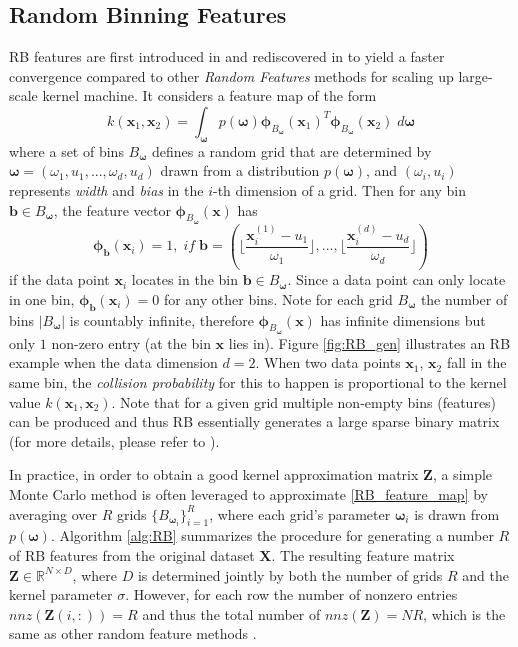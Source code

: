 \documentclass[sigconf]{acmart}
\newcommand{\R}{\mathbb{R}}
\newcommand{\1}{\boldsymbol{1}}
\newcommand{\bb}{\boldsymbol{b}}
\newcommand{\bx}{\boldsymbol{x}}
\newcommand{\omegab}{\boldsymbol{\omega}}
\newcommand{\phib}{\boldsymbol{\phi}}
\newcommand{\bX}{\mathbf{X}}
\newcommand{\bZ}{\mathbf{Z}}
\newcommand{\bphi}{\boldsymbol{\phi}}
\newcommand{\0}{\boldsymbol{0}}
\begin{document}
\subsection{Random Binning Features}
RB features are first introduced in \cite{rahimi2008random} and rediscovered in \cite{wu2016revisiting} to yield a faster convergence compared to other \emph{Random Features} methods for scaling up large-scale kernel machine. It considers a feature map of the form
\begin{equation}\label{RB_feature_map}
k(\bx_1,\bx_2)=\int_{\omegab} p(\omegab) \phib_{B_{\omegab}}(\bx_1)^T\phib_{B_{\omegab}}(\bx_2) \;d\omegab
\end{equation}
where a set of bins $B_{\omegab}$ defines a random grid that are determined by $\omegab=(\omega_1,u_1,...,\omega_d,u_d)$ drawn from a distribution $p(\omegab)$, and $(\omega_i,u_i)$ represents \emph{width} and \emph{bias} in the $i$-th dimension of a grid. Then for any bin $\bb \in B_{\omegab}$, the feature vector $\phib_{B_{\omegab}}(\bx)$ has
$$
\phib_{\bb}(\bx_i)=1, \;\textit{if}\; \bb = (\lfloor \frac{\bx_{i}^{(1)}-u_1}{\omega_1}\rfloor, ..., \lfloor \frac{\bx_{i}^{(d)}-u_d}{\omega_d}\rfloor)
$$ 
if the data point $\bx_i$ locates in the bin $\bb \in B_{\omegab}$. Since a data point can only locate in one bin, $\phib_{\bb}(\bx_i)=0$ for any other bins. 
Note for each grid $B_{\omegab}$ the number of bins $|B_{\omegab}|$ is countably infinite, therefore $\bphi_{B_{\omegab}}(\bx)$ has infinite dimensions but only $1$ non-zero entry (at the bin $\bx$ lies in). 
Figure \ref{fig:RB_gen} illustrates an RB example when the data dimension $d=2$.
When two data points $\bx_1$, $\bx_2$ fall in the same bin, the \emph{collision probability} for this to happen is proportional to the kernel value $k(\bx_1,\bx_2)$. Note that for a given grid multiple non-empty bins (features) can be produced and thus RB essentially generates a large sparse binary matrix (for more details, please refer to \cite{wu2016revisiting}). 


In practice, in order to obtain a good kernel approximation matrix $\bZ$, a simple Monte Carlo method is often leveraged to approximate \eqref{RB_feature_map} by averaging over $R$ grids $\{B_{\omegab_i}\}_{i=1}^R$, where each grid's parameter $\omegab_i$ is drawn from $p(\omegab)$. Algorithm \ref{alg:RB} summarizes the procedure for generating a number $R$ of RB features from the original dataset $\bX$. The resulting feature matrix $\bZ \in \R^{N \times D}$, where $D$ is determined jointly by both the number of grids $R$ and the kernel parameter $\sigma$. However, for each row the number of nonzero entries $nnz(\bZ(i,:)) = R$ and thus the total number of $nnz(\bZ) = NR$, which is the same as other random feature methods \cite{wu2016revisiting}.
\end{document}
